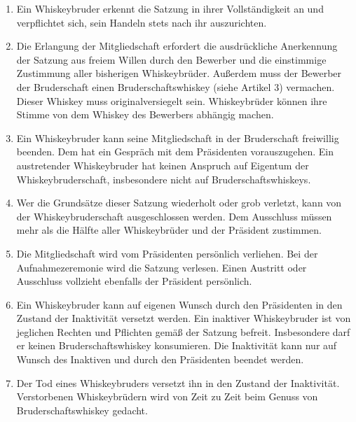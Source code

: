 \documentclass[a4paper,12pt]{article}
\begin{document}
\begin{enumerate}

\item Ein Whiskeybruder erkennt die  Satzung in ihrer Vollständigkeit an und verpflichtet sich, sein
  Handeln stets nach ihr auszurichten.

\item Die Erlangung der Mitgliedschaft erfordert die ausdrückliche Anerkennung der Satzung aus
  freiem Willen durch den Bewerber und die einstimmige Zustimmung aller bisherigen Whiskeybrüder.
  Außerdem muss der Bewerber der Bruderschaft einen Bruderschaftswhiskey (siehe Artikel 3)
  vermachen. Dieser Whiskey muss originalversiegelt sein. Whiskeybrüder können ihre Stimme von dem
  Whiskey des Bewerbers abhängig machen.

\item Ein Whiskeybruder kann seine Mitgliedschaft in der Bruderschaft freiwillig beenden. Dem hat
  ein Gespräch mit dem Präsidenten vorauszugehen. Ein austretender Whiskeybruder hat keinen Anspruch
  auf Eigentum der Whiskeybruderschaft, insbesondere nicht auf Bruderschaftswhiskeys.

\item Wer die Grundsätze dieser Satzung wiederholt oder grob verletzt, kann von der
  Whiskeybruderschaft ausgeschlossen werden. Dem Ausschluss müssen mehr als die Hälfte aller
  Whiskeybrüder und der Präsident zustimmen.

\item Die Mitgliedschaft wird vom Präsidenten persönlich verliehen. Bei der Aufnahmezeremonie wird
  die Satzung verlesen. Einen Austritt oder Ausschluss vollzieht ebenfalls der Präsident persönlich.

\item Ein Whiskeybruder kann auf eigenen Wunsch durch den Präsidenten in den Zustand der Inaktivität
  versetzt werden. Ein inaktiver Whiskeybruder ist von jeglichen Rechten und Pflichten gemäß der
  Satzung befreit. Insbesondere darf er keinen Bruderschaftswhiskey konsumieren. Die Inaktivität
  kann nur auf Wunsch des Inaktiven und durch den Präsidenten beendet werden.

\item Der Tod eines Whiskeybruders versetzt ihn in den Zustand der Inaktivität. Verstorbenen
  Whiskeybrüdern wird von Zeit zu Zeit beim Genuss von Bruderschaftswhiskey gedacht.

\end{enumerate}
\end{document}
